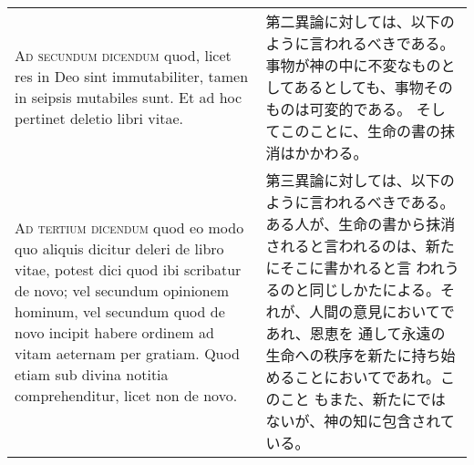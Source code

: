 \documentclass[10pt]{jsarticle} %
\begin{document}
\begin{longtable}{p{21em}p{21em}}
\\


{\scshape Ad secundum dicendum} quod, licet res in Deo
sint immutabiliter, tamen in seipsis mutabiles sunt. Et ad hoc pertinet
deletio libri vitae.


&

第二異論に対しては、以下のように言われるべきである。
事物が神の中に不変なものとしてあるとしても、事物そのものは可変的である。
 そしてこのことに、生命の書の抹消はかかわる。


\\


{\scshape Ad tertium dicendum} quod eo modo quo aliquis
dicitur deleri de libro vitae, potest dici quod ibi scribatur de novo;
vel secundum opinionem hominum, vel secundum quod de novo incipit habere
ordinem ad vitam aeternam per gratiam. Quod etiam sub divina notitia
comprehenditur, licet non de novo.


&

第三異論に対しては、以下のように言われるべきである。
ある人が、生命の書から抹消されると言われるのは、新たにそこに書かれると言
 われうるのと同じしかたによる。それが、人間の意見においてであれ、恩恵を
 通して永遠の生命への秩序を新たに持ち始めることにおいてであれ。このこと
 もまた、新たにではないが、神の知に包含されている。



\end{longtable}
\end{document}
